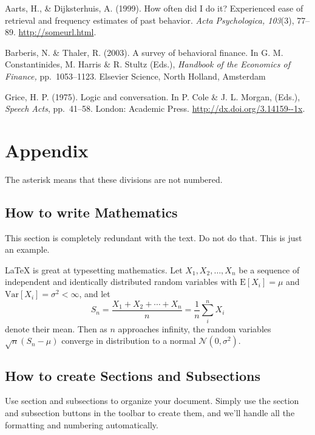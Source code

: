 \documentclass[twocolumn]{article}
\begin{document}
\begin{hangparas}{1em}{1}

  Aarts, H., \& Dijksterhuis, A. (1999).  How often did I do it?
  Experienced ease of retrieval and frequency estimates of past
  behavior.  \textit{Acta Psychologica, 103}(3), 77--89. \url{http://someurl.html}.

  Barberis, N. \& Thaler, R. (2003). A survey of behavioral finance.
  In G. M. Constantinides, M. Harris \& R. Stultz (Eds.),
  \textit{Handbook of the Economics of Finance,} pp.\ 1053--1123.
  Elsevier Science, North Holland, Amsterdam

\vfill %
\break

Grice, H. P. (1975).  Logic and conversation. In P. Cole \& J.
L. Morgan, (Eds.), \textit{Speech Acts}, pp.\ 41--58. London: Academic
Press. \url{http://dx.doi.org/3.14159--1x}.
\end{hangparas}

\bigskip
\section*{Appendix}

The asterisk means that these divisions are not numbered.

\subsection*{How to write Mathematics}

This section is completely redundant with the text. Do not do
that. This is just an example.

\LaTeX{} is great at typesetting mathematics. Let $X_1, X_2, \ldots, X_n$ be a sequence of independent and identically distributed random variables with $\text{E}[X_i] = \mu$ and $\text{Var}[X_i] = \sigma^2 < \infty$, and let
\[S_n = \frac{X_1 + X_2 + \cdots + X_n}{n}
      = \frac{1}{n}\sum_{i}^{n} X_i\]
denote their mean. Then as $n$ approaches infinity, the random variables $\sqrt{n}(S_n - \mu)$ converge in distribution to a normal $\mathcal{N}(0, \sigma^2)$.


\subsection*{How to create Sections and Subsections}

Use section and subsections to organize your document. Simply use the section and subsection buttons in the toolbar to create them, and we'll handle all the formatting and numbering automatically.
\end{document}
